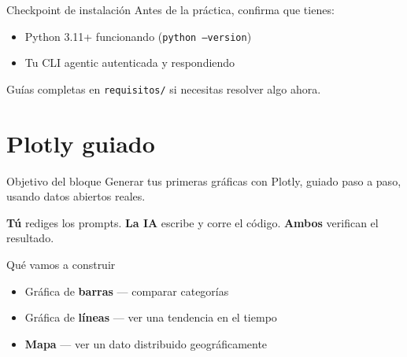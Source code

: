 \documentclass[light,minted=false]{cuzbeamer} %
\begin{document}

    \begin{frame}{Checkpoint de instalación}
        Antes de la práctica, confirma que tienes:
        \begin{itemize}
            \item Python 3.11+ funcionando (\texttt{python --version})
            \item Tu CLI agentic autenticada y respondiendo
        \end{itemize}

        \vspace{1em}
        Guías completas en \texttt{requisitos/} si necesitas resolver algo ahora.
    \end{frame}

    \section{Plotly guiado}

    \begin{frame}{Objetivo del bloque}
        Generar tus primeras gráficas con Plotly, guiado paso a paso, usando
        datos abiertos reales.

        \vspace{1em}
        \textbf{Tú} rediges los prompts. \textbf{La IA} escribe y corre el código.
        \textbf{Ambos} verifican el resultado.
    \end{frame}

    \begin{frame}{Qué vamos a construir}
        \begin{itemize}
            \item Gráfica de \textbf{barras} — comparar categorías
            \item Gráfica de \textbf{líneas} — ver una tendencia en el tiempo
            \item \textbf{Mapa} — ver un dato distribuido geográficamente
        \end{itemize}
    \end{frame}
\end{document}
